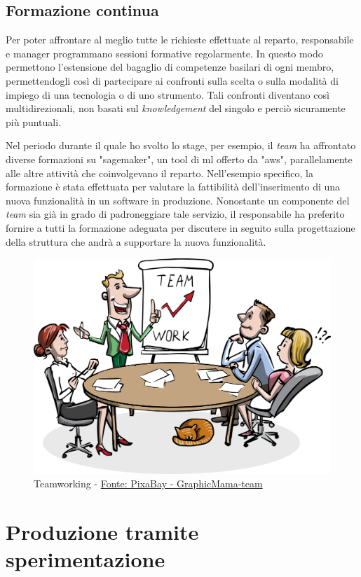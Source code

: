 \subsection{Formazione continua}
Per poter affrontare al meglio tutte le richieste effettuate al reparto, responsabile e manager programmano sessioni formative regolarmente. In questo modo permettono l'estensione del bagaglio di competenze basilari di ogni membro, permettendogli così di partecipare ai confronti sulla scelta o sulla modalità di impiego di una tecnologia o di uno strumento. Tali confronti diventano così multidirezionali, non basati sul \textit{knowledgement} del singolo e perciò sicuramente più puntuali.

Nel periodo durante il quale ho svolto lo stage, per esempio, il \textit{team} ha affrontato diverse formazioni su "\gls{sagemaker}"\glsfirstoccur, un tool di \acrlong{ml} offerto da "\acrlong{aws}"\glsfirstoccur, parallelamente alle altre attività che coinvolgevano il reparto. Nell'esempio specifico, la formazione è stata effettuata per valutare la fattibilità dell'inserimento di una nuova funzionalità in un software in produzione. Nonostante un componente del \textit{team} sia già in grado di padroneggiare tale servizio, il responsabile ha preferito fornire a tutti la formazione adeguata per discutere in seguito sulla progettazione della struttura che andrà a supportare la nuova funzionalità.

\begin{figure}[H] 
    \centering 
    \includegraphics[width=0.5\columnwidth]{immagini/team_working.png} 
    \caption{Teamworking - \href{https://pixabay.com/it/users/GraphicMama-team-2641041/?utm_source=link-attribution&amp;utm_medium=referral&amp;utm_campaign=image&amp;utm_content=1453895}{Fonte: PixaBay - GraphicMama-team}}
    \label{fig:teamworking}
\end{figure}
\section{Produzione tramite sperimentazione}
